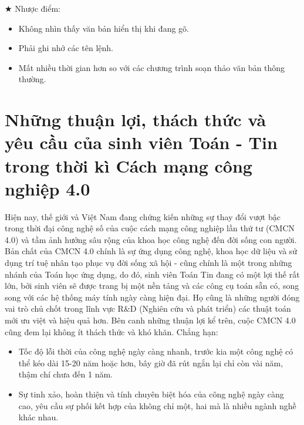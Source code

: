 \documentclass[12pt,a4paper]{report}
\begin{document}
    \begin{center}
    $ \bigstar $ Nhược điểm:
    \end{center}
    \begin{itemize}
    	\item Không nhìn thấy văn bản hiển thị khi đang gõ.
    	\item Phải ghi nhớ các tên lệnh.
    	\item Mất nhiều thời gian hơn so với các chương trình soạn thảo văn bản thông thường.
    \end{itemize}
    



    

    \chapter{Những thuận lợi, thách thức và yêu cầu của sinh viên Toán - Tin trong thời kì Cách mạng công nghiệp 4.0}
    
        Hiện nay, thế giới và Việt Nam đang chứng kiến những sự thay đổi vượt bậc trong thời đại công nghệ số của cuộc cách mạng công nghiệp lần thứ tư (CMCN 4.0) và tầm ảnh hưởng sâu rộng của khoa học công nghệ đến đời sống con người. Bản chất của CMCN 4.0 chính là sự ứng dụng công nghệ, khoa học dữ liệu và sử dụng trí tuệ nhân tạo phục vụ đời sống xã hội - cũng chính là một trong những nhánh của Toán học ứng dụng, do đó, sinh viên Toán Tin đang có một lợi thế rất lớn, bởi sinh viên sẽ được trang bị một nền tảng và các công cụ toán sẵn có, song song với các hệ thống máy tính ngày càng hiện đại. Họ cũng là những người đóng vai trò chủ chốt trong lĩnh vực R$\&$D (Nghiên cứu và phát triển) các thuật toán mới ưu việt và hiệu quả hơn. Bên canh những thuận lợi kể trên, cuộc CMCN 4.0 cũng đem lại không ít thách thức và khó khăn. Chẳng hạn:
        
        \begin{itemize}
            \item Tốc độ lỗi thời của công nghệ ngày càng nhanh, trước kia một công nghệ có thể kéo dài 15-20 năm hoặc hơn, bây giờ đã rút ngắn lại chỉ còn vài năm, thậm chí chưa đến 1 năm.
            \item Sự tinh xảo, hoàn thiện và tính chuyên biệt hóa của công nghệ ngày càng cao, yêu cầu sự phối kết hợp của không chỉ một, hai mà là nhiều ngành nghề khác nhau.
        \end{itemize}
    
\end{document}
